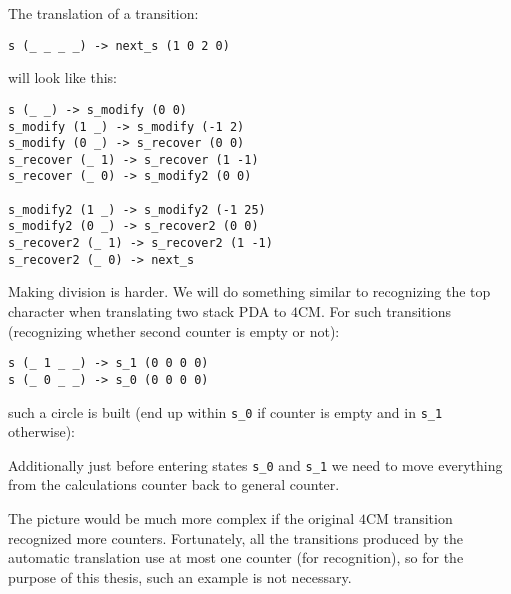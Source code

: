 \documentclass[english,shortabstract,mgr]{iithesis}
\begin{document}
The translation of a transition:
\begin{verbatim}
s (_ _ _ _) -> next_s (1 0 2 0)
\end{verbatim}
%
will look like this:
\begin{verbatim}
s (_ _) -> s_modify (0 0)
s_modify (1 _) -> s_modify (-1 2)
s_modify (0 _) -> s_recover (0 0)
s_recover (_ 1) -> s_recover (1 -1)
s_recover (_ 0) -> s_modify2 (0 0)

s_modify2 (1 _) -> s_modify2 (-1 25)
s_modify2 (0 _) -> s_recover2 (0 0)
s_recover2 (_ 1) -> s_recover2 (1 -1)
s_recover2 (_ 0) -> next_s
\end{verbatim}


Making division is harder. We will do something similar to recognizing the top
character when translating two stack PDA to $4$CM. For such transitions (recognizing
whether second counter is empty or not):
\begin{verbatim}
s (_ 1 _ _) -> s_1 (0 0 0 0)
s (_ 0 _ _) -> s_0 (0 0 0 0)
\end{verbatim}
%
such a circle is built (end up within \texttt{s\_0} if counter is empty and in \texttt{s\_1} otherwise):

\begin{center}
\end{center}

Additionally just before entering states \texttt{s\_0} and \texttt{s\_1}
we need to move everything from the calculations counter back to general counter.

The picture would be much more complex if the original $4$CM transition
recognized more counters. Fortunately, all the transitions produced by
the automatic translation use at most one counter (for recognition),
so for the purpose of this thesis, such an example is not necessary.
\end{document}
